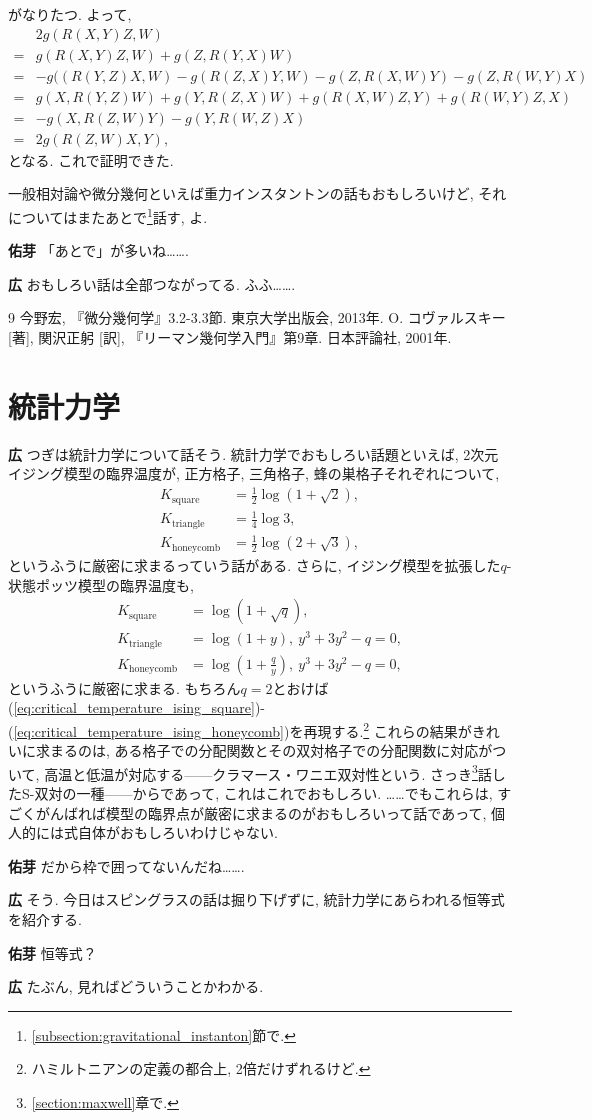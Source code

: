 \documentclass{ltjsarticle}
\theoremstyle{definition}
\newcommand{\parno}{\par\noindent}
\begin{document}
がなりたつ. よって,
\begin{align}
&2g(R(X,Y)Z,W)\\
=&g(R(X,Y)Z,W)+g(Z,R(Y,X)W)\\
=&-g((R(Y,Z)X,W)-g(R(Z,X)Y,W)-g(Z,R(X,W)Y)-g(Z,R(W,Y)X)\\
=&g(X,R(Y,Z)W)+g(Y,R(Z,X)W)+g(R(X,W)Z,Y)+g(R(W,Y)Z,X)\\
=&-g(X,R(Z,W)Y)-g(Y,R(W,Z)X)\\
=&2g(R(Z,W)X,Y),
\end{align}
となる. これで証明できた.\par
一般相対論や微分幾何といえば重力インスタントンの話もおもしろいけど, それについてはまたあとで\footnote{\ref{subsection:gravitational_instanton}節で.}話す, よ.\parno
\textbf{佑芽} 「あとで」が多いね…….\parno
\textbf{広} おもしろい話は全部つながってる. ふふ…….

\begin{thebibliography}{9}
 今野宏, 『微分幾何学』3.2-3.3節. 東京大学出版会, 2013年. 
 O. コヴァルスキー [著], 関沢正躬 [訳], 『リーマン幾何学入門』第9章. 日本評論社, 2001年.
\end{thebibliography}

\section{統計力学\label{section:statistical_mechanics}}
\noindent
\textbf{広} つぎは統計力学について話そう. 統計力学でおもしろい話題といえば, 2次元イジング模型の臨界温度が, 正方格子, 三角格子, 蜂の巣格子それぞれについて,
\begin{align}
  K_{\mathrm{square}}&=\frac12\log(1+\sqrt2),\label{eq:critical_temperature_ising_square}\\
  K_{\mathrm{triangle}}&=\frac14\log3,\\
  K_{\mathrm{honeycomb}}&=\frac12\log(2+\sqrt3),\label{eq:critical_temperature_ising_honeycomb}
\end{align}
というふうに厳密に求まるっていう話がある. さらに, イジング模型を拡張した$q$-状態ポッツ模型の臨界温度も,
\begin{align}
  K_{\mathrm{square}}&=\log(1+\sqrt q),\\
  K_{\mathrm{triangle}}&=\log(1+y),\ y^3+3y^2-q=0,\\
  K_{\mathrm{honeycomb}}&=\log(1+\frac qy),\ y^3+3y^2-q=0,
\end{align}
というふうに厳密に求まる. もちろん$q=2$とおけば(\ref{eq:critical_temperature_ising_square})-(\ref{eq:critical_temperature_ising_honeycomb})を再現する.\footnote{ハミルトニアンの定義の都合上, 2倍だけずれるけど.} これらの結果がきれいに求まるのは, ある格子での分配関数とその双対格子での分配関数に対応がついて, 高温と低温が対応する------クラマース・ワニエ双対性という. さっき\footnote{\ref{section:maxwell}章で.}話したS-双対の一種------からであって, これはこれでおもしろい. ……でもこれらは, すごくがんばれば模型の臨界点が厳密に求まるのがおもしろいって話であって, 個人的には式自体がおもしろいわけじゃない.\parno
\textbf{佑芽} だから枠で囲ってないんだね…….\parno
\textbf{広} そう. 今日はスピングラスの話は掘り下げずに, 統計力学にあらわれる恒等式を紹介する.\parno
\textbf{佑芽} 恒等式？\parno
\textbf{広} たぶん, 見ればどういうことかわかる.
\end{document}
